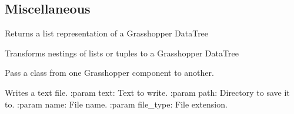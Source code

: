 \documentclass[letterpaper,10pt,english]{sphinxmanual}
\begin{document}
\subsection{Miscellaneous}
\label{\detokenize{lib:miscellaneous}}\label{\detokenize{lib:module-livestock.lib.misc}}

\begin{fulllineitems}
\label{\detokenize{lib:livestock.lib.misc.tree_to_list}}
Returns a list representation of a Grasshopper DataTree

\end{fulllineitems}


\begin{fulllineitems}
\label{\detokenize{lib:livestock.lib.misc.list_to_tree}}
Transforms nestings of lists or tuples to a Grasshopper DataTree

\end{fulllineitems}


\begin{fulllineitems}
\label{\detokenize{lib:livestock.lib.misc.PassClass}}
Pass a class from one Grasshopper component to another.

\end{fulllineitems}


\begin{fulllineitems}
\label{\detokenize{lib:livestock.lib.misc.write_file}}
Writes a text file.
:param text: Text to write.
:param path: Directory to save it to.
:param name: File name.
:param file\_type: File extension.

\end{fulllineitems}
\end{document}
